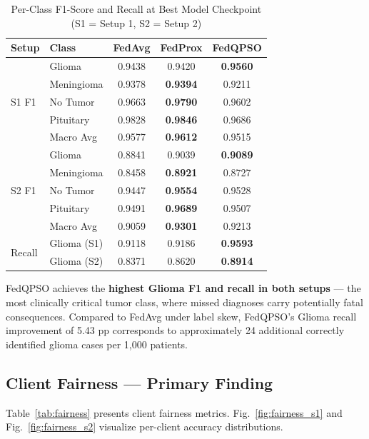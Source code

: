 \documentclass[conference]{IEEEtran}
\begin{document}
\begin{table}[t]
\caption{Per-Class F1-Score and Recall at Best Model Checkpoint
(S1 = Setup 1, S2 = Setup 2)}
\label{tab:perclass}
\begin{center}
\renewcommand{\arraystretch}{1.15}
\begin{tabular}{llccc}
\hline
\textbf{Setup} & \textbf{Class} & \textbf{FedAvg} & \textbf{FedProx} &
\textbf{FedQPSO}\\
\hline
\multirow{5}{*}{S1 F1}
 & Glioma    & 0.9438 & 0.9420 & \textbf{0.9560}\\
 & Meningioma & 0.9378 & \textbf{0.9394} & 0.9211\\
 & No Tumor  & 0.9663 & \textbf{0.9790} & 0.9602\\
 & Pituitary & 0.9828 & \textbf{0.9846} & 0.9686\\
 & Macro Avg & 0.9577 & \textbf{0.9612} & 0.9515\\
\hline
\multirow{5}{*}{S2 F1}
 & Glioma    & 0.8841 & 0.9039 & \textbf{0.9089}\\
 & Meningioma & 0.8458 & \textbf{0.8921} & 0.8727\\
 & No Tumor  & 0.9447 & \textbf{0.9554} & 0.9528\\
 & Pituitary & 0.9491 & \textbf{0.9689} & 0.9507\\
 & Macro Avg & 0.9059 & \textbf{0.9301} & 0.9213\\
\hline
\multirow{2}{*}{Recall}
 & Glioma (S1) & 0.9118 & 0.9186 & \textbf{0.9593}\\
 & Glioma (S2) & 0.8371 & 0.8620 & \textbf{0.8914}\\
\hline
\end{tabular}
\end{center}
\end{table}

FedQPSO achieves the \textbf{highest Glioma F1 and recall in both setups} --- the
most clinically critical tumor class, where missed diagnoses carry potentially
fatal consequences. Compared to FedAvg under label skew, FedQPSO's Glioma
recall improvement of 5.43 pp corresponds to approximately 24 additional
correctly identified glioma cases per 1,000 patients.

\subsection{Client Fairness --- Primary Finding}

Table~\ref{tab:fairness} presents client fairness metrics. Fig.~\ref{fig:fairness_s1}
and Fig.~\ref{fig:fairness_s2} visualize per-client accuracy distributions.
\end{document}
